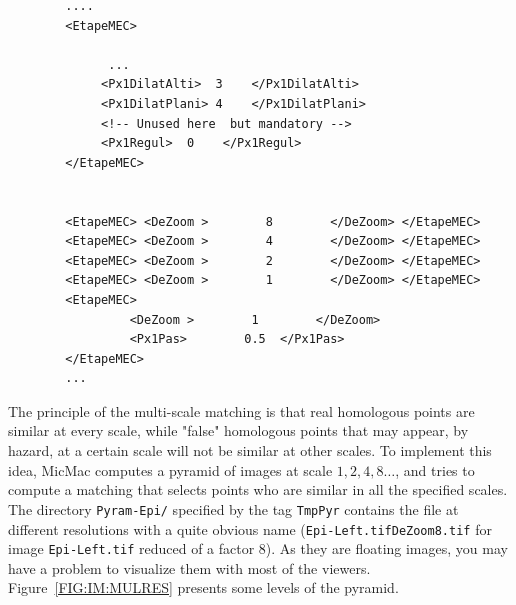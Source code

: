 {\scriptsize
\begin{verbatim}
        ....
        <EtapeMEC>
               
              ...
             <Px1DilatAlti>  3    </Px1DilatAlti>
             <Px1DilatPlani> 4    </Px1DilatPlani>
             <!-- Unused here  but mandatory -->
             <Px1Regul>  0    </Px1Regul>
        </EtapeMEC>


        <EtapeMEC> <DeZoom >        8        </DeZoom> </EtapeMEC>
        <EtapeMEC> <DeZoom >        4        </DeZoom> </EtapeMEC>
        <EtapeMEC> <DeZoom >        2        </DeZoom> </EtapeMEC>
        <EtapeMEC> <DeZoom >        1        </DeZoom> </EtapeMEC>
        <EtapeMEC>
                 <DeZoom >        1        </DeZoom>
                 <Px1Pas>        0.5  </Px1Pas>
        </EtapeMEC>
        ...

\end{verbatim}
}

The principle of the multi-scale matching is that real homologous points are similar
at every scale, while "false" homologous points that may appear, by hazard, at a certain
scale will not be similar at other scales. To implement this idea, MicMac computes
a pyramid of images at scale $1,2,4,8 \dots$, and tries to compute a matching that
selects points who are similar in all the specified scales. The directory
{\tt Pyram-Epi/} specified by the tag {\tt TmpPyr} contains the file at different
resolutions with a quite obvious name ({\tt Epi-Left.tifDeZoom8.tif}  for
image {\tt Epi-Left.tif} reduced of a factor $8$). As they are floating images,
you may have a problem to visualize them with most of the viewers. Figure~\ref{FIG:IM:MULRES}
presents some levels of the pyramid.


